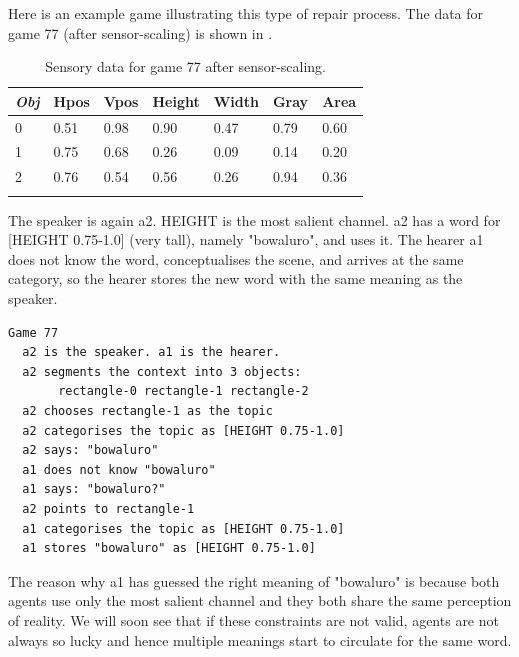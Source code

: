 Here is an example game illustrating this
type of repair process. 
The data for game 77 (after sensor-scaling)
is shown in . 
\begin{table}
\begin{center}
\begin{tabular}{ l  l  l  l  l  l  l }
\lsptoprule
{\itshape Obj} & Hpos & Vpos & Height & Width & Gray & Area \\ \midrule
0 & 0.51 & 0.98 & 0.90 & 0.47 & 0.79 & 0.60\\ 
1 & 0.75 & 0.68 & 0.26 & 0.09 & 0.14 & 0.20\\ 
2 & 0.76 & 0.54 & 0.56 & 0.26 & 0.94 & 0.36\\ 
\lspbottomrule
\end{tabular}
\caption{\label{tab:game77} Sensory data for game 77 after sensor-scaling.}
\end{center}
\end{table}
The speaker is again {\bfshape  a2}. HEIGHT is the most salient channel. 
{\bfshape  a2} has a word for [HEIGHT 0.75-1.0] (very tall), namely
"bowaluro", and uses it. The hearer {\bfshape  a1} 
does not know the 
word, conceptualises the scene, and arrives at the 
same category, so the hearer stores the new word
with the same meaning as the speaker. 
\begin{verbatim}
Game 77
  a2 is the speaker. a1 is the hearer. 
  a2 segments the context into 3 objects: 
       rectangle-0 rectangle-1 rectangle-2
  a2 chooses rectangle-1 as the topic 
  a2 categorises the topic as [HEIGHT 0.75-1.0]
  a2 says: "bowaluro"
  a1 does not know "bowaluro"
  a1 says: "bowaluro?"
  a2 points to rectangle-1
  a1 categorises the topic as [HEIGHT 0.75-1.0]
  a1 stores "bowaluro" as [HEIGHT 0.75-1.0]
\end{verbatim}
The reason why {\bfshape  a1} has guessed the right 
meaning of "bowaluro" is because both agents use
only the most salient channel and they both share
the same perception of reality. We will soon see 
that if these constraints are not valid, agents 
are not always so lucky and hence multiple meanings
start to circulate for the same word. 

